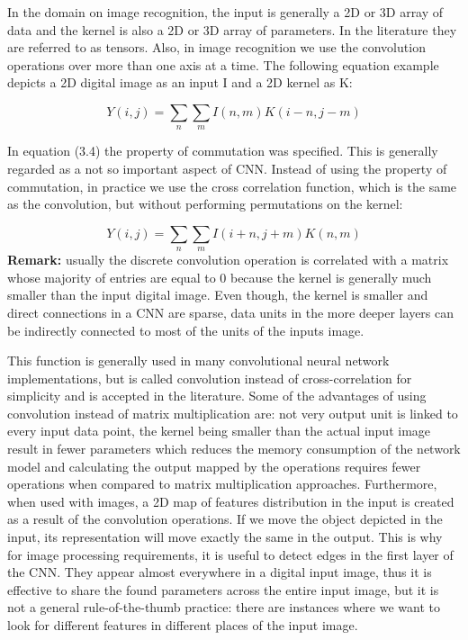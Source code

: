 \documentclass[12pt,a4paper,twoside]{report}
\begin{document}
In the domain on image recognition, the input is generally a 2D or 3D array of data and the kernel is also a 2D or 3D array of parameters. In the literature they are referred to as tensors. Also, in image recognition we use the convolution operations over more than one axis at a time. The following equation example depicts a 2D digital image as an input I and a 2D kernel as K:

\begin{equation}
Y(i,j) = \sum_{n}\sum_{m} I(n,m)K(i-n,j-m)
\end{equation}

In equation (3.4) the property of commutation was specified. This is generally regarded as a not so important aspect of CNN. Instead of using the property of commutation, in practice we use the cross correlation function, which is the same as the convolution, but without performing permutations on the kernel: 

\begin{equation}
Y(i,j) = \sum_{n}\sum_{m} I(i+n,j+m)K(n,m)
\end{equation}
\textbf{Remark:} usually the discrete convolution operation is correlated with a matrix whose majority of entries are equal to 0 because the kernel is generally much smaller than the input digital image. Even though, the kernel is smaller and direct connections in a CNN are sparse, data units in the more deeper layers can be indirectly connected to most of the units of the inputs image.

This function is generally used in many convolutional neural network implementations, but is called convolution instead of cross-correlation for simplicity and is accepted in the literature. Some of the advantages of using convolution instead of matrix multiplication are: not very output unit is linked to every input data point, the kernel being smaller than the actual input image result in fewer parameters which reduces the memory consumption of the network model and calculating the output mapped by the operations requires fewer operations when compared to matrix multiplication approaches. Furthermore, when used with images, a 2D map of features distribution in the input is created as a result of the convolution operations. If we move the object depicted in the input, its representation will move exactly the same in the output. This is why for image processing requirements, it is useful to detect edges in the first layer of the CNN. They appear almost everywhere in a digital input image, thus it is effective to share the found parameters across the entire input image, but it is not a general rule-of-the-thumb practice: there are instances where we want to look for different features in different places of the input image.
\end{document}
